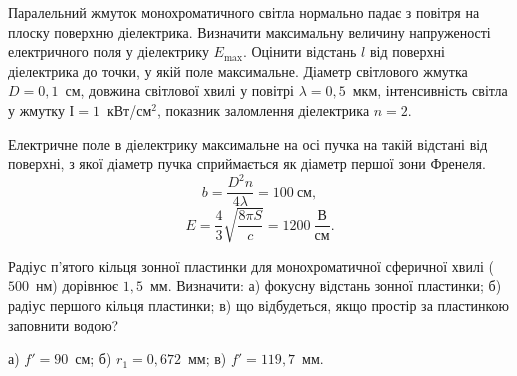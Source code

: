 \begin{problem}%
    Паралельний жмуток монохроматичного світла нормально падає з повітря на плоску поверхню діелектрика. Визначити максимальну величину напруженості електричного поля у діелектрику $E_{\max}$. Оцінити відстань $l$ від поверхні діелектрика до точки, у якій поле максимальне. Діаметр світлового жмутка $D = 0,1$~см, довжина світлової хвилі у повітрі $\lambda = 0,5$~мкм, інтенсивність світла у жмутку $І = 1$~кВт/см$^2$, показник заломлення діелектрика $n = 2$.
    \begin{solution}
        Електричне поле в діелектрику максимальне на осі пучка на такій відстані від поверхні, з якої діаметр пучка сприймається як діаметр першої зони Френеля.
        \begin{equation*}
            b = \frac{D^2n}{4\lambda} = 100\ \text{см},
        \end{equation*}
        \begin{equation*}
            E = \frac43 \sqrt{\frac{8\pi S}{c}} = 1200\ \frac{\text{В}}{см}.
        \end{equation*}
    \end{solution}
\end{problem}


\begin{problem}%
    Радіус п'ятого кільця зонної пластинки для монохроматичної сферичної хвилі ($500$~нм) дорівнює $1,5$~мм. Визначити: а) фокусну відстань зонної пластинки; б) радіус першого кільця пластинки; в) що відбудеться, якщо простір за пластинкою заповнити водою?
    \begin{solution}
        а) $ f' = 90 $~см; б) $ r_1 = 0,672 $~мм; в) $ f' =119,7 $~мм.
    \end{solution}
\end{problem}


